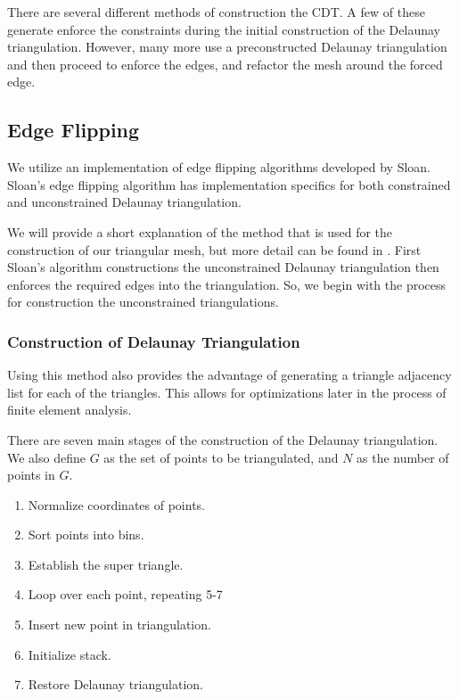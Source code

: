 \documentclass[../fem.tex]{subfiles}
\begin{document}
There are several different methods of construction the CDT. A few of these
generate enforce the constraints during the initial construction of the
Delaunay triangulation. However, many more use a preconstructed Delaunay
triangulation and then proceed to enforce the edges, and refactor the mesh
around the forced edge.

\subsection{Edge Flipping}%
\label{sub:edge_flipping}

We utilize an implementation of edge flipping algorithms developed by Sloan.
Sloan's edge flipping algorithm has implementation specifics for both
constrained and unconstrained Delaunay triangulation.

We will provide a short explanation of the method that is used for the
construction of our triangular mesh, but more detail can be found in
\cite{S_DT}\cite{S_CDT}. First Sloan's algorithm constructions the
unconstrained Delaunay triangulation then enforces the required edges into the
triangulation. So, we begin with the process for construction the unconstrained
triangulations.

\subsubsection{Construction of Delaunay Triangulation}%
\label{ssub:construction_of_delaunay_triangulation}

Using this method also provides the advantage of generating a triangle
adjacency list for each of the triangles. This allows for optimizations later
in the process of finite element analysis.

There are seven main stages of the construction of the Delaunay triangulation.
We also define $G$ as the set of points to be triangulated, and $N$ as the
number of points in $G$.

\begin{enumerate}[label=\arabic*.]
  \item Normalize coordinates of points.
  \item Sort points into bins.
  \item Establish the super triangle.
  \item Loop over each point, repeating 5-7
  \item Insert new point in triangulation.
  \item Initialize stack.
  \item Restore Delaunay triangulation.
\end{enumerate}
\end{document}
